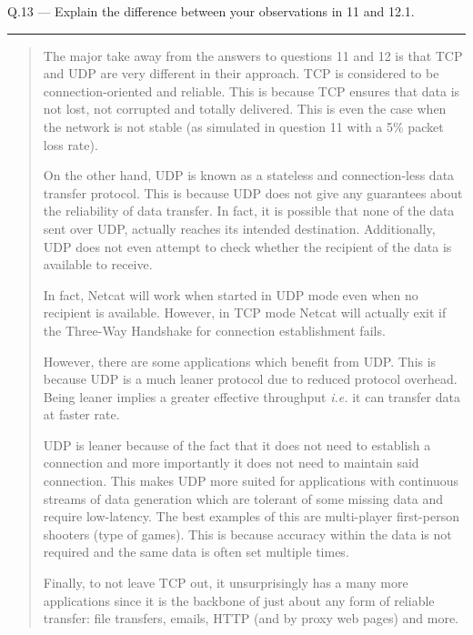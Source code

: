\documentclass{article}
\newcommand\Que[2]{%
\begin{samepage}
\leavevmode\par
\noindent
Q.#1 --- #2\par\vspace{10pt}\hrule\vspace{10pt}
\end{samepage}}
\newenvironment{ans}
{\fbox{Answer}\begin{quote}\nopagebreak}
{\end{quote}}
\newcommand\ie{\emph{i.e.}}
\begin{document}
\Que{13}{Explain the difference between your observations in 11
and 12.1.}
\begin{ans}
The major take away from the answers to questions 11 and 12 is
that TCP and UDP are very different in their approach. TCP is
considered to be connection-oriented and reliable. This is
because TCP ensures that data is not lost, not corrupted and
totally delivered. This is even the case when the network is not
stable (as simulated in question 11 with a 5\% packet loss
rate).

On the other hand, UDP is known as a stateless and
connection-less data transfer protocol. This is because UDP does
not give any guarantees about the reliability of data transfer.
In fact, it is possible that none of the data sent over UDP,
actually reaches its intended destination. Additionally, UDP
does not even attempt to check whether the recipient of the data
is available to receive.

In fact, Netcat will work when started in UDP mode even
when no recipient is available. However, in TCP mode Netcat
will actually exit if the Three-Way Handshake for
connection establishment fails.

However, there are some applications which benefit from UDP.
This is because UDP is a much leaner protocol due to reduced
protocol overhead. Being leaner implies a greater effective
throughput \ie{} it can transfer data at faster rate. 

UDP is leaner because of the fact that it does not need to
establish a connection and more importantly it does not need to
maintain said connection. This makes UDP more suited for
applications with continuous streams of data generation which
are tolerant of some missing data and require low-latency. The
best examples of this are multi-player first-person shooters
(type of games). This is because accuracy within the data is not
required and the same data is often set multiple times.

Finally, to not leave TCP out, it unsurprisingly has a many more
applications since it is the backbone of just about any form of
reliable transfer: file transfers, emails, HTTP (and by proxy
web pages) and more.
\end{ans}
\end{document}
